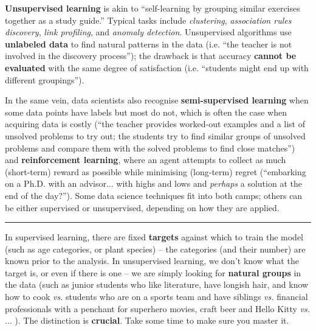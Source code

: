 \textbf{Unsupervised learning} is akin to ``self-learning by grouping similar exercises together as a study guide.'' Typical tasks include \textit{clustering}, \textit{association rules discovery}, \textit{link profiling}, and \textit{anomaly detection}. Unsupervised algorithms use \textbf{unlabeled data} to find natural patterns in the data  (i.e. ``the teacher is not involved in the discovery process''); the drawback is that accuracy \textbf{cannot be evaluated} with the same degree of satisfaction (i.e. ``students might end up with different groupings'').\par In the same vein, data scientists also recognise \textbf{semi-supervised learning} when some data points have labels but most do not, which is often the case when acquiring data is costly (``the teacher provides worked-out examples and a list of unsolved problems to try out; the students try to find similar groups of unsolved problems and compare them with the solved problems to find close matches'') and \textbf{reinforcement learning}, where an agent attempts to collect as much (short-term) reward as possible while minimising (long-term) regret (``embarking on a Ph.D. with an advisor... with highs and lows and \textit{perhaps} a solution at the end of the day?''). Some data science techniques fit into both camps; others can be either supervised or unsupervised, depending on how they are applied.
\begin{center}
    \rule{0.5\textwidth}{.4pt}
\end{center} 
In supervised learning, there are fixed \textbf{targets} against which to train the model (such as age categories, or plant species) -- the categories (and their number) are known prior to the analysis.  In unsupervised learning, we don't know what the target is, or even if there is one -- we are simply looking for \textbf{natural groups} in the data (such as junior students who like literature, have longish hair, and know how to cook \textit{vs.} students who are on a sports team and have siblings \textit{vs.} financial professionals with a penchant for superhero movies, craft beer and Hello Kitty \textit{vs.} ... ). The distinction is \textbf{crucial}. Take some time to make sure you master it. \label{unsl}
